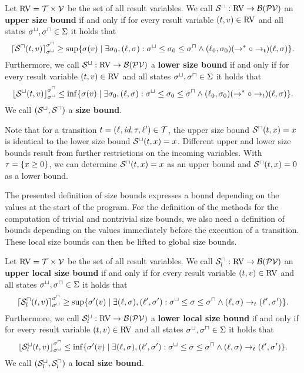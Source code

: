 \begin{definition}
  Let $\text{RV} = \mathcal{T} \times \mathcal{V}$ be the set of all result variables.
  We call ${\mathcal{S}^\sqcap}: \text{RV} \rightarrow \mathcal{B}(\mathcal{PV})$ an \textbf{upper size bound} if and only if for every result variable $(t, v) \in \text{RV}$ and all states ${\sigma^\sqcup}, {\sigma^\sqcap} \in \Sigma$ it holds that
  \[ \left\lceil {\mathcal{S}^\sqcap}(t, v) \right\rceil^{{\sigma^\sqcap}}_{{\sigma^\sqcup}} \geq \sup \lbrace  \sigma(v) \mid \exists \sigma_0, (\ell, \sigma): {\sigma^\sqcup} \leq \sigma_0 \leq {\sigma^\sqcap} \wedge (\ell_0, \sigma_0) (\rightarrow^* \circ \rightarrow_t) (\ell, \sigma) \rbrace. \]
  Furthermore, we call ${\mathcal{S}^\sqcup}: \text{RV} \rightarrow \mathcal{B}(\mathcal{PV})$ a \textbf{lower size bound} if and only if for every result variable $(t, v) \in \text{RV}$ and all states ${\sigma^\sqcup}, {\sigma^\sqcap} \in \Sigma$ it holds that
  \[ \left\lfloor {\mathcal{S}^\sqcup}(t, v) \right\rfloor^{{\sigma^\sqcap}}_{{\sigma^\sqcup}} \leq \inf \lbrace  \sigma(v) \mid \exists \sigma_0, (\ell, \sigma): {\sigma^\sqcup} \leq \sigma_0 \leq {\sigma^\sqcap} \wedge (\ell_0, \sigma_0) (\rightarrow^* \circ \rightarrow_t) (\ell, \sigma) \rbrace. \]
  We call ${({\mathcal{S}^\sqcup}, {\mathcal{S}^\sqcap})}$ a \textbf{size bound}.
\end{definition}

Note that for a transition $t = (\ell,\emph{id},\tau,\ell') \in \mathcal{T}$, the upper size bound ${\mathcal{S}^\sqcap}(t,x) = x$ is identical to the lower size bound ${\mathcal{S}^\sqcup}(t,x) = x$.
Different upper and lower size bounds result from further restrictions on the incoming variables.
With $\tau = \lbrace x \geq 0 \rbrace$, we can determine ${\mathcal{S}^\sqcap}(t,x) = x$ as an upper bound and ${\mathcal{S}^\sqcap}(t,x) = 0$ as a lower bound.

The presented definition of size bounds expresses a bound depending on the values at the start of the program.
For the definition of the methods for the computation of trivial and nontrivial size bounds, we also need a definition of bounds depending on the values immediately before the execution of a transition.
These local size bounds can then be lifted to global size bounds.

\begin{definition}
  Let $\text{RV} = \mathcal{T} \times \mathcal{V}$ be the set of all result variables.
  We call ${\mathcal{S}^\sqcap_l}: \text{RV} \rightarrow \mathcal{B}(\mathcal{PV})$ an \textbf{upper local size bound} if and only if for every result variable $(t, v) \in \text{RV}$ and all states ${\sigma^\sqcup}, {\sigma^\sqcap} \in \Sigma$ it holds that
  \[ \left\lceil {\mathcal{S}^\sqcap_l}(t, v) \right\rceil^{{\sigma^\sqcap}}_{{\sigma^\sqcup}} \geq \sup \lbrace \sigma'(v) \mid \exists (\ell, \sigma), (\ell', \sigma'): {\sigma^\sqcup} \leq \sigma \leq {\sigma^\sqcap} \wedge (\ell, \sigma) \rightarrow_t (\ell', \sigma') \rbrace. \]
  Furthermore, we call ${\mathcal{S}^\sqcup_l}: \text{RV} \rightarrow \mathcal{B}(\mathcal{PV})$ a \textbf{lower local size bound} if and only if for every result variable $(t, v) \in \text{RV}$ and all states ${\sigma^\sqcup}, {\sigma^\sqcap} \in \Sigma$ it holds that
  \[ \left\lfloor {\mathcal{S}^\sqcup_l}(t, v) \right\rfloor^{{\sigma^\sqcap}}_{{\sigma^\sqcup}} \leq \inf \lbrace \sigma'(v) \mid \exists (\ell, \sigma), (\ell', \sigma'): {\sigma^\sqcup} \leq \sigma \leq {\sigma^\sqcap} \wedge (\ell, \sigma) \rightarrow_t (\ell', \sigma') \rbrace. \]
  We call ${({\mathcal{S}^\sqcup_l}, {\mathcal{S}^\sqcap_l})}$ a \textbf{local size bound}.
\end{definition}

